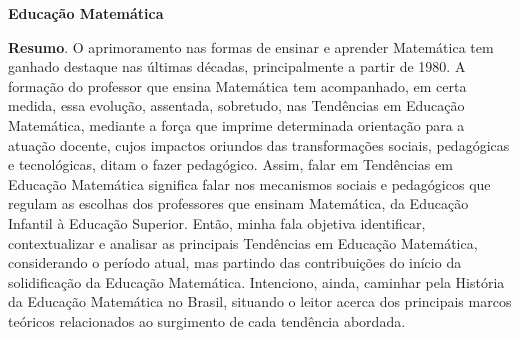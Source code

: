 
\pagestyle{fancy}

\lhead{}
\rhead{}


\renewcommand{\headrulewidth}{0.4pt}
\renewcommand{\footrulewidth}{0.4pt}


\begin{center}
	\huge{{\bf Educa\c{c}\~{a}o Matem\'{a}tica}}
	\vspace{1cm}
\end{center}



	
	
	\noindent\textbf{Resumo}.\label{gem} 
	O aprimoramento nas formas de ensinar e aprender Matemática tem ganhado destaque nas últimas décadas, principalmente a partir de 1980. A formação do professor que ensina Matemática tem acompanhado, em certa medida, essa evolução, assentada, sobretudo, nas Tendências em Educação Matemática, mediante a força que imprime determinada orientação para a atuação docente, cujos impactos oriundos das transformações sociais, pedagógicas e tecnológicas, ditam o fazer pedagógico. Assim, falar em Tendências em Educação Matemática significa falar nos mecanismos sociais e pedagógicos que regulam as escolhas dos professores que ensinam Matemática, da Educação Infantil à Educação Superior. Então, minha fala objetiva identificar, contextualizar e analisar as principais Tendências em Educação Matemática, considerando o período atual, mas partindo das contribuições do início da solidificação da Educação Matemática. Intenciono, ainda, caminhar pela História da Educação Matemática no Brasil, situando o leitor acerca dos principais marcos teóricos relacionados ao surgimento de cada tendência abordada.  


